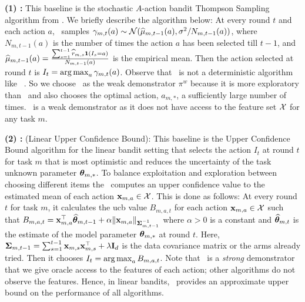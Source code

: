 \textbf{(1) \ts:} This baseline is the stochastic $A$-action bandit Thompson Sampling algorithm from \citet{thompson1933likelihood,agrawal2012analysis,russo2018tutorial,zhu2020thompson}. We briefly describe the algorithm below: At every round $t$ and each action $a$, \ts\  samples $\gamma_{m,t}(a) \sim \mathcal{N}(\widehat{\mu}_{m,t-1}(a), \sigma^2/N_{m,t-1}(a))$, where $N_{m,t-1}(a)$ is the number of times the action $a$ has been selected till $t-1$, and $\widehat{\mu}_{m,t-1}(a) = \frac{\sum_{s=1}^{t-1} \widehat{r}_{m,s}\mathbf{1}(I_s =a)}{N_{m,t-1}(a)}$ is the empirical mean. Then the action selected at round $t$ is $I_{t} = \mathop{\rm arg\,max}_a \gamma_{m,t}(a)$. 
%
Observe that \ts\ is not a deterministic algorithm like \ucb\ \citep{auer2002finite-time}. So we choose \ts\ as the weak demonstrator $\pi^w$ because it is more exploratory than \ucb\ and also chooses the optimal action, $a_{m, *}$, a sufficiently large number of times. 
% 
\ts\ is a weak demonstrator as it does not have access to the feature set $\mathcal{X}$ for any task $m$. 

\textbf{(2) \linucb:} (Linear Upper Confidence Bound): This baseline is the Upper Confidence Bound algorithm for the linear bandit setting that selects the action $I_t$ at round $t$ for task $m$ that is most optimistic and reduces the uncertainty of the task unknown parameter $\boldsymbol{\theta}_{m,*}$.
%
To balance exploitation and exploration between choosing different items the \linucb\ computes an upper confidence value to the estimated mean of each action $\mathbf{x}_{m,a} \in \mathcal{X}$. 
%
This is done as follows: At every round $t$ for task $m$, it calculates the ucb value $B_{m,a,t}$ for each action $\mathbf{x}_{m,a} \in \mathcal{X}$ such that $B_{m,a,t} = \mathbf{x}_{m,a}^\top \widehat{\boldsymbol{\theta}}_{m,t-1} + \alpha\|\mathbf{x}_{m,a}\|_{\mathbf{\Sigma}_{m,t-1}^{-1}}$ where $\alpha > 0$ is a constant and $\widehat{\boldsymbol{\theta}}_{m,t}$ is the estimate of the model parameter $\boldsymbol{\theta}_{m, *}$ at round $t$. 
%
Here, $\mathbf{\Sigma}_{m,t-1} = \sum_{s=1}^{t-1}\mathbf{x}_{m,s}\mathbf{x}_{m,s}^\top +\lambda\mathbf{I}_d$ is the data covariance matrix or the arms already tried.
%
Then it chooses $I_t = \mathop{\rm arg\,max}_{a}B_{m,a,t}$. 
Note that \linucb\ is a \textit{strong} demonstrator that we give oracle access to the features of each action; other algorithms do not observe the features.
% 
Hence, in linear bandits, \linucb\ provides an approximate upper bound on the performance of all algorithms.

